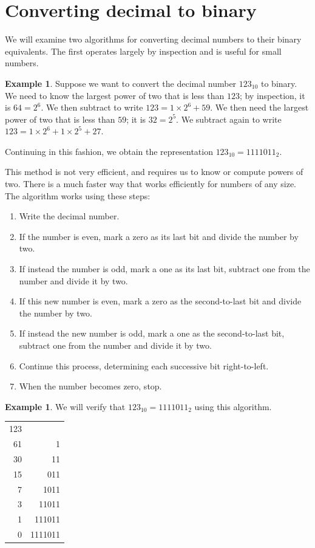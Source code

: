 \documentclass{book}
\theoremstyle{plain}
\theoremstyle{definition}
\newtheorem{example}[theorem]{Example}
\begin{document}
\section{Converting decimal to binary}
We will examine two algorithms for converting decimal numbers to their binary equivalents. The first operates largely by inspection and is useful for small numbers.

\begin{example}
Suppose we want to convert the decimal number $123_{10}$ to binary. We need to know the largest power of two that is less than $123$; by inspection, it is $64 = 2^6$. We then subtract to write $123 = 1 \times 2^6 + 59$. We then need the largest power of two that is less than $59$; it is $32 = 2^5$. We subtract again to write $123 = 1 \times 2^6 + 1 \times 2^5 + 27$.

Continuing in this fashion, we obtain the representation $123_{10} = 1111011_2$.
\end{example}

This method is not very efficient, and requires us to know or compute powers of two. There is a much faster way that works efficiently for numbers of any size. The algorithm works using these steps:
\begin{enumerate}
\item Write the decimal number.
\item If the number is even, mark a zero as its last bit and divide the number by two.
\item If instead the number is odd, mark a one as its last bit, subtract one from the number and divide it by two.
\item If this new number is even, mark a zero as the second-to-last bit and divide the number by two.
\item If instead the new number is odd, mark a one as the second-to-last bit, subtract one from the number and divide it by two.
\item Continue this process, determining each successive bit right-to-left.
\item When the number becomes zero, stop.
\end{enumerate}

\begin{example}
We will verify that $123_{10} = 1111011_2$ using this algorithm.
\begin{center}
\begin{tabular}{r|r}
123 & \\
61 & 1 \\
30 & 11 \\
15 & 011 \\
7 & 1011 \\
3 & 11011 \\
1 & 111011 \\
0 & 1111011
\end{tabular}
\end{center}
\end{example}
\end{document}
